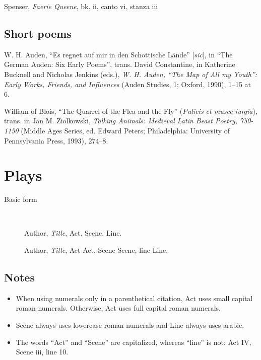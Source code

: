 \documentclass[extrafontsizes,11pt,a4paper,oneside]{memoir}
\newcommand*{\lit}[1]{\textsf{#1}}
\begin{document}
Spenser, \emph{Faerie Queene}, bk. ii, canto vi, stanza iii
  
\section{Short poems}


W. H. Auden, \enquote{Es regnet auf mir in den Schottische Lände} [\emph{sic}], in \enquote{The German Auden: Six Early Poems}, trans. David Constantine, in Katherine Bucknell and Nicholas Jenkins (eds.), \emph{W. H. Auden, \enquote{The Map of All my Youth}: Early Works, Friends, and Influences} (Auden Studies, 1; Oxford, 1990), 1--15 at 6.

William of Blois, \enquote{The Quarrel of the Flea and the Fly} (\emph{Pulicis et musce iurgia}), trans. in Jan M. Ziolkowski, \emph{Talking Animals: Medieval Latin Beast Poetry, 750-1150} (Middle Ages Series, ed. Edward Peters; Philadelphia: University of Pennsylvania Press, 1993), 274--8.
  
\chapter{Plays}\label{sec:play}

\begin{description}
  \item[Basic form]~
  \par Author, \emph{Title}, Act. Scene. Line.
  \par Author, \emph{Title}, \lit{Act} Act, \lit{Scene} Scene, \lit{line} Line.
\end{description}

\section{Notes}

\begin{itemize}
  \item When using numerals only in a parenthetical citation, Act uses small capital roman numerals. Otherwise, Act uses full capital roman numerals.
  
  \item Scene always uses lowercase roman numerals and Line always uses arabic.
  
  \item The words \enquote{Act} and \enquote{Scene} are capitalized, whereas \enquote{line} is not: Act IV, Scene iii, line 10.
\end{itemize}
\end{document}
